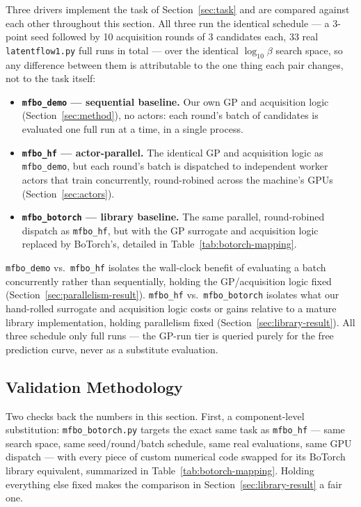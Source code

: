 \documentclass[11pt]{article}
\begin{document}
Three drivers implement the task of Section~\ref{sec:task} and are
compared against each other throughout this section. All three run the
identical schedule — a 3-point seed followed by 10 acquisition rounds of
3 candidates each, 33 real \texttt{latentflow1.py} full runs in total —
over the identical $\log_{10}\beta$ search space, so any difference
between them is attributable to the one thing each pair changes, not to
the task itself:
\begin{itemize}
  \item \textbf{\texttt{mfbo\_demo} — sequential baseline.} Our own GP
    and acquisition logic (Section~\ref{sec:method}), no actors: each
    round's batch of candidates is evaluated one full run at a time, in a
    single process.
  \item \textbf{\texttt{mfbo\_hf} — actor-parallel.} The identical GP and
    acquisition logic as \texttt{mfbo\_demo}, but each round's batch is
    dispatched to independent worker actors that train concurrently,
    round-robined across the machine's GPUs (Section~\ref{sec:actors}).
  \item \textbf{\texttt{mfbo\_botorch} — library baseline.} The same
    parallel, round-robined dispatch as \texttt{mfbo\_hf}, but with the
    GP surrogate and acquisition logic replaced by BoTorch's, detailed in
    Table~\ref{tab:botorch-mapping}.
\end{itemize}
\texttt{mfbo\_demo} vs.\ \texttt{mfbo\_hf} isolates the wall-clock benefit
of evaluating a batch concurrently rather than sequentially, holding the
GP/acquisition logic fixed (Section~\ref{sec:parallelism-result}).
\texttt{mfbo\_hf} vs.\ \texttt{mfbo\_botorch} isolates what our
hand-rolled surrogate and acquisition logic costs or gains relative to a
mature library implementation, holding parallelism fixed
(Section~\ref{sec:library-result}). All three schedule only full runs —
the GP-run tier is queried purely for the free prediction curve, never as
a substitute evaluation.

\subsection{Validation Methodology}
\label{sec:validation}

Two checks back the numbers in this section. First, a component-level
substitution: \texttt{mfbo\_botorch.py} targets the exact same task as
\texttt{mfbo\_hf} — same search space, same seed/round/batch schedule,
same real evaluations, same GPU dispatch — with every piece of custom
numerical code swapped for its BoTorch library equivalent, summarized in
Table~\ref{tab:botorch-mapping}. Holding everything else fixed makes the
comparison in Section~\ref{sec:library-result} a fair one.
\end{document}
